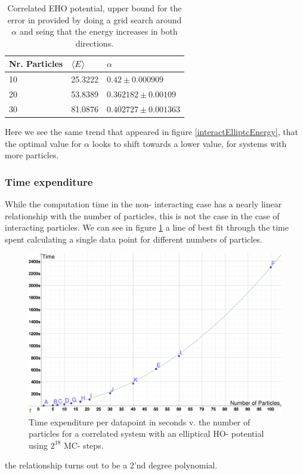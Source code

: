 \documentclass[11pt,a4paper,titlepage]{article}
\begin{document}
\begin{table}[H]
\centering
\begin{tabular}{|l|l|l|}
\hline
Nr. Particles & $\braket{E}$       & $\alpha$               \\ \hline
10            & 25.3222 & $0.42 \pm 0.000909$      \\ \hline
20            & 53.8389 & $0.362182  \pm 0.00109$ \\ \hline
30            & 81.0876 & $0.402727 \pm 0.001363$    \\ \hline
\end{tabular}\caption[Optimal alpha from steepest descent]{Correlated EHO potential, upper bound for the error in provided by doing a grid search around $\alpha$ and seing that the energy increases in both directions.}\label{table}
\end{table}
Here we see the same trend that appeared in figure \ref{interactElliptcEnergy}, that the optimal value for $\alpha$ looks to shift towards a lower value, for systems with more particles.

\subsubsection{Time expenditure}
While the computation time in the non- interacting case has a nearly linear relationship with the number of particles, this is not the case in the case of interacting particles. We can see in figure \ref{InteractTimeExpend} a line of best fit through the time spent calculating a single data point for different numbers of particles. 
\begin{figure}[H]
\centering

\includegraphics[trim=0cm 0.0cm 0cm 0.0cm, clip=true,scale = 0.25]{geogebra-export.pdf}
\caption[Time expended per datapoint (interacting) ]{Time expenditure per datapoint in seconds v. the number of particles for a correlated system with an elliptical HO- potential using $2^{18}$ MC- steps.}\label{InteractTimeExpend}
\end{figure}
the relationship turns out to be a 2'nd degree polynomial. 
\end{document}
